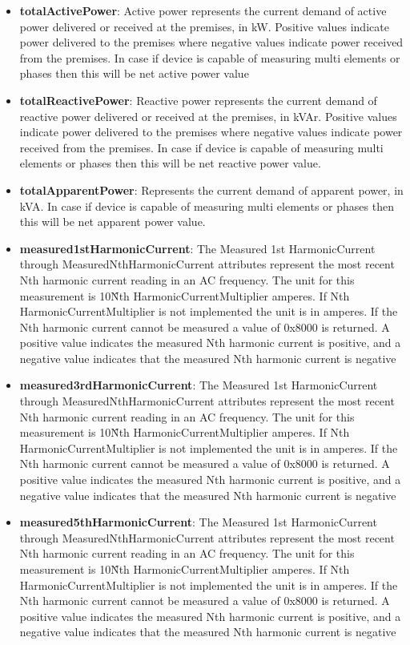 \begin{itemize}
\item \textbf{totalActivePower}: Active power represents the current demand of active power delivered or received at the premises, in kW. Positive values indicate power delivered to the premises where negative values indicate power received from the premises. In case if device is capable of measuring multi elements or phases then this will be net active power value
\item \textbf{totalReactivePower}: Reactive power represents the current demand of reactive power delivered or received at the premises, in kVAr. Positive values indicate power delivered to the premises where negative values indicate power received from the premises. In case if device is capable of measuring multi elements or phases then this will be net reactive power value.
\item \textbf{totalApparentPower}: Represents the current demand of apparent power, in kVA. In case if device is capable of measuring multi elements or phases then this will be net apparent power value.
\item \textbf{measured1stHarmonicCurrent}: The Measured 1st HarmonicCurrent through MeasuredNthHarmonicCurrent attributes represent the most recent Nth harmonic current reading in an AC frequency. The unit for this measurement is 10\^Nth HarmonicCurrentMultiplier amperes. If Nth HarmonicCurrentMultiplier is not implemented the unit is in amperes. If the Nth harmonic current cannot be measured a value of 0x8000 is returned. A positive value indicates the measured Nth harmonic current is positive, and a negative value indicates that the measured Nth harmonic current is negative
\item \textbf{measured3rdHarmonicCurrent}: The Measured 1st HarmonicCurrent through MeasuredNthHarmonicCurrent attributes represent the most recent Nth harmonic current reading in an AC frequency. The unit for this measurement is 10\^Nth HarmonicCurrentMultiplier amperes. If Nth HarmonicCurrentMultiplier is not implemented the unit is in amperes. If the Nth harmonic current cannot be measured a value of 0x8000 is returned. A positive value indicates the measured Nth harmonic current is positive, and a negative value indicates that the measured Nth harmonic current is negative
\item \textbf{measured5thHarmonicCurrent}: The Measured 1st HarmonicCurrent through MeasuredNthHarmonicCurrent attributes represent the most recent Nth harmonic current reading in an AC frequency. The unit for this measurement is 10\^Nth HarmonicCurrentMultiplier amperes. If Nth HarmonicCurrentMultiplier is not implemented the unit is in amperes. If the Nth harmonic current cannot be measured a value of 0x8000 is returned. A positive value indicates the measured Nth harmonic current is positive, and a negative value indicates that the measured Nth harmonic current is negative

\end{itemize}
